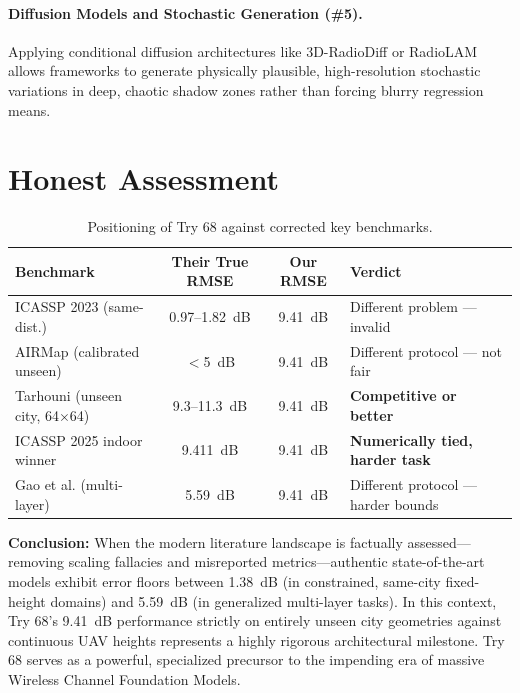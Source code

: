 \documentclass[11pt,a4paper]{article}
\newcommand{\better}[1]{\textcolor{good}{\textbf{#1}}}
\begin{document}
\paragraph{Diffusion Models and Stochastic Generation (\#5).}
Applying conditional diffusion architectures like 3D-RadioDiff or RadioLAM \cite{radiolam2025} \cite{radiodiff2025} allows frameworks to generate physically plausible, high-resolution stochastic variations in deep, chaotic shadow zones rather than forcing blurry regression means.

\section{Honest Assessment}
\label{sec:assessment}

\begin{table}[h!]
\centering
\caption{Positioning of Try 68 against corrected key benchmarks.}
\label{tab:assessment}
\begin{tabularx}{\textwidth}{Xccl}
\toprule
\textbf{Benchmark} & \textbf{Their True RMSE} & \textbf{Our RMSE} & \textbf{Verdict} \\
\midrule
ICASSP 2023 (same-dist.) & 0.97--1.82~dB & 9.41~dB & Different problem --- invalid \\
AIRMap (calibrated unseen) & $<$5~dB & 9.41~dB & Different protocol --- not fair \\
Tarhouni (unseen city, 64$\times$64) & 9.3--11.3~dB & 9.41~dB & \better{Competitive or better} \\
ICASSP 2025 indoor winner & 9.411~dB & 9.41~dB & \better{Numerically tied, harder task} \\
Gao et al. (multi-layer) & 5.59~dB & 9.41~dB & Different protocol --- harder bounds \\
\bottomrule
\end{tabularx}
\end{table}

\textbf{Conclusion:} When the modern literature landscape is factually assessed—removing scaling fallacies and misreported metrics—authentic state-of-the-art models exhibit error floors between 1.38~dB (in constrained, same-city fixed-height domains) and 5.59~dB (in generalized multi-layer tasks). In this context, Try 68's 9.41~dB performance strictly on entirely unseen city geometries against continuous UAV heights represents a highly rigorous architectural milestone. Try 68 serves as a powerful, specialized precursor to the impending era of massive Wireless Channel Foundation Models.
\end{document}
